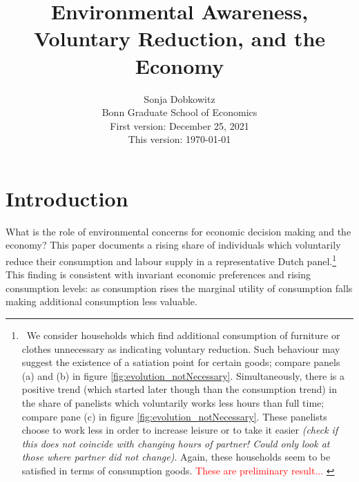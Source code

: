 \documentclass[12pt]{article}
\title{Environmental Awareness, Voluntary Reduction, and the Economy}
\date{Sonja Dobkowitz\\ Bonn Graduate School of Economics\\ %
	\vspace{1mm}
	First version: December 25, 2021\\
	This version: \today }
\newcommand{\tr}[1]{\textcolor{red}{#1}}
\begin{document}
	\maketitle


%
%

	
\section{Introduction}
What is the role of environmental concerns for economic decision making and the economy? %
This paper documents a rising share of individuals which voluntarily reduce their consumption and labour supply in a representative Dutch panel.\footnote{\ We consider households which find additional consumption of furniture or clothes unnecessary as indicating voluntary reduction. Such behaviour may suggest the existence of a satiation point for certain goods; compare panels (a) and (b) in figure \ref{fig:evolution_notNecessary}. Simultaneously, there is a positive trend (which started later though than the consumption trend) in the share of panelists which voluntarily works less hours than full time; compare pane (c) in figure \ref{fig:evolution_notNecessary}. These panelists choose to work less in order to increase leisure or to take it easier \textit{(check if this does not coincide with changing hours of partner! Could only look at those where partner did not change)}. Again, these households seem to be satisfied in terms of consumption goods. \tr{These are preliminary result... }} 
This finding is consistent with invariant economic preferences and rising consumption levels: as consumption rises the marginal utility of consumption falls making additional consumption less valuable. 
\end{document}
